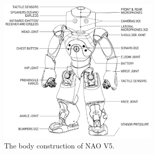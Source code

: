 \begin{figure}
	[h]
	\centering
	\includegraphics[height=7cm]{figures/content/nao-body.jpg} 
	\caption{The body construction of NAO V5. \cite{8}} \label{fg:nao:body} 
\end{figure}
